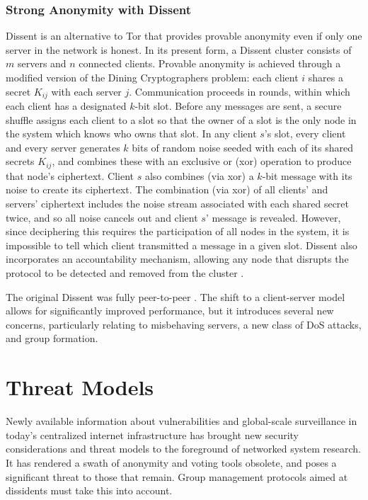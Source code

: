     \subsubsection{Strong Anonymity with Dissent}
  Dissent is an alternative to Tor that provides provable anonymity even if
  only one server in the network is honest\cite{p2pd}.
  In its present form, a Dissent cluster consists of $m$ servers and $n$
  connected clients\cite{din}. Provable anonymity is
  achieved through a modified version of the Dining Cryptographers
  problem\cite{chaum_dining_1988}: each client $i$ shares a secret $K_{ij}$
  with each server $j$. Communication proceeds in rounds, within which each
  client has a designated $k$-bit slot.  Before any messages are sent, a
  secure shuffle\cite{neff} assigns each client to a slot so
  that the owner of a slot is the only node in the system which knows who owns
  that slot.  In any client $s$'s slot, every client and every server
  generates $k$ bits of random noise seeded with each of its shared secrets
  $K_{ij}$, and combines these with an exclusive or (xor) operation to produce
  that node's ciphertext. Client $s$ also combines (via xor) a $k$-bit message
  with its noise to create its ciphertext. The combination (via xor) of all
  clients' and servers' ciphertext includes the noise stream associated with
  each shared secret twice, and so all noise cancels out and client $s$'
  message is revealed. However, since deciphering this requires the
  participation of all nodes in the system, it is impossible to tell which
  client transmitted a message in a given slot. Dissent also incorporates an
  accountability mechanism, allowing any node that disrupts the protocol to be
  detected and removed from the cluster
  \cite{verdict}.

  The original Dissent was fully peer-to-peer
  \cite{p2pd}. The shift to a client-server model
  allows for significantly improved performance, but it introduces several new
  concerns, particularly relating to misbehaving servers, a new class of DoS
  attacks, and group formation.

\section{Threat Models}
  Newly available information about vulnerabilities and global-scale
  surveillance in today's centralized internet infrastructure has brought new
  security considerations and threat models to the foreground of networked
  system research. It has rendered a swath of anonymity and voting tools
  obsolete, and poses a significant threat to those that remain. Group
  management protocols aimed at dissidents must take this into account.

